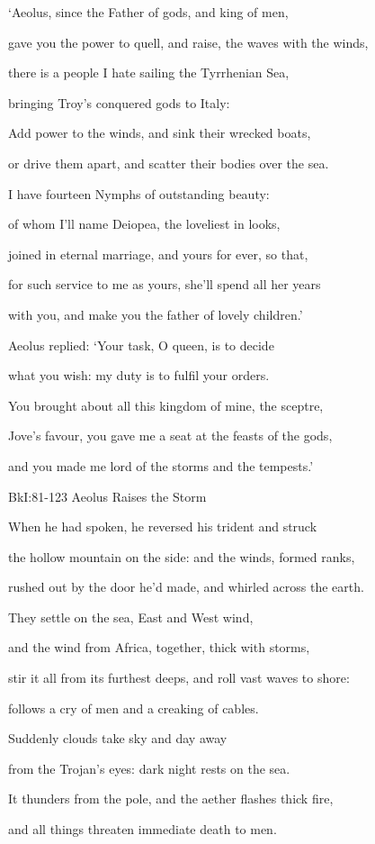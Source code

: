 \documentclass[10pt, a4paper, titlepage]{article}
\begin{document}
‘Aeolus, since the Father of gods, and king of men,

gave you the power to quell, and raise, the waves with the winds,

there is a people I hate sailing the Tyrrhenian Sea,

bringing Troy’s conquered gods to Italy:

Add power to the winds, and sink their wrecked boats,

or drive them apart, and scatter their bodies over the sea.

I have fourteen Nymphs of outstanding beauty:

of whom I’ll name Deiopea, the loveliest in looks,

joined in eternal marriage, and yours for ever, so that,

for such service to me as yours, she’ll spend all her years

with you, and make you the father of lovely children.’

Aeolus replied: ‘Your task, O queen, is to decide

what you wish: my duty is to fulfil your orders.

You brought about all this kingdom of mine, the sceptre,

Jove’s favour, you gave me a seat at the feasts of the gods,

and you made me lord of the storms and the tempests.’


BkI:81-123 Aeolus Raises the Storm

When he had spoken, he reversed his trident and struck

the hollow mountain on the side: and the winds, formed ranks,

rushed out by the door he’d made, and whirled across the earth.

They settle on the sea, East and West wind,

and the wind from Africa, together, thick with storms,

stir it all from its furthest deeps, and roll vast waves to shore:

follows a cry of men and a creaking of cables.

Suddenly clouds take sky and day away

from the Trojan’s eyes: dark night rests on the sea.

It thunders from the pole, and the aether flashes thick fire,

and all things threaten immediate death to men.
\end{document}
